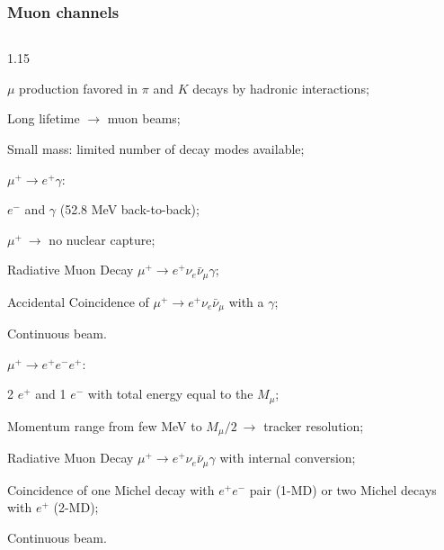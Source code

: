 \documentclass{beamer}
\begin{document}
\begin{frame}
    \frametitle{Muon channels}
    \vspace{-3mm}
    \begin{columns}
     \begin{column}{1.15\framewidth}
     \setlength{\leftmargini}{1.1em}
    
        \begin{itemize}
       {\small   
       \item $\mu$ production favored in $\pi$ and $K$ decays by hadronic interactions;
       \vspace{0.9mm}
       \item Long lifetime $\rightarrow$ muon beams;
       \vspace{0.9mm}
       \item Small mass: limited number of decay modes available;
       \vspace{0.9mm}
       \item $\mu^+ \rightarrow e^+ \gamma$:
        \vspace{0.7mm}
       }
       \begin{itemize}
        {\small \item $e^-$ and $\gamma$ (52.8 MeV back-to-back);
         \vspace{0.7mm}
        \item $ \mu^+ \ \rightarrow$ no nuclear capture;
         \vspace{0.7mm}
        \item Radiative Muon Decay $\mu^+ \rightarrow e^+ \nu_e \bar{\nu}_\mu \gamma$;
         \vspace{0.7mm}
        \item Accidental Coincidence of $\mu^+ \rightarrow e^+ \nu_e \bar{\nu}_\mu$ with a $\gamma$; 
         \vspace{0.7mm}
        \item Continuous beam.
        }
       \end{itemize}
       \vspace{0.9mm}
       \item $\mu^+ \rightarrow e^+ e^- e^+$:
        \vspace{0.7mm}
       \begin{itemize}
        {\small \item 2 $e^+$ and 1 $e^-$ with total energy equal to the $M_\mu$;
         \vspace{0.7mm}
        \item Momentum range from few MeV to $M_\mu/2 \ \rightarrow$ tracker resolution;
         \vspace{0.7mm}
        \item Radiative Muon Decay $\mu^+ \rightarrow e^+ \nu_e \bar{\nu}_\mu \gamma$ with internal conversion;
         \vspace{0.7mm}
        \item Coincidence of one Michel decay with $e^+e^-$ pair (1-MD) or 
        two Michel decays with $e^+$ (2-MD);
         \vspace{0.7mm}
        \item Continuous beam.

}
\end{itemize}
\end{itemize}
\end{column}
\end{columns}
\end{frame}
\end{document}
